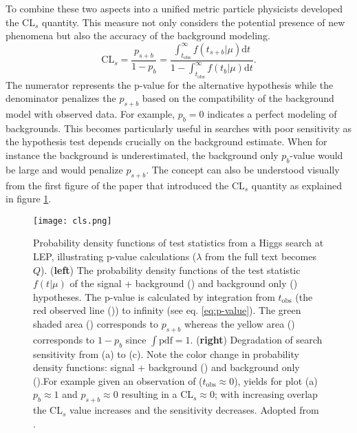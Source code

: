 To combine these two aspects into a unified metric particle physicists developed the CL$_s$ quantity. This measure not only considers the potential presence of new phenomena but also the accuracy of the background modeling.
\begin{equation}
    \mathrm{CL}_s=\frac{p_{s+b}}{1-p_{b}}=
    \frac
    {\int_{t_\text{obs}}^{\infty}
        f(t_{s+b} | \mu) \mathrm{d}t}
    {1-\int_{t_\text{obs}}^{\infty}
        f(t_{b} | \mu) \mathrm{d}t}.
\end{equation}
The numerator represents the p-value for the alternative hypothesis while the denominator penalizes the $p_{s+b}$ based on the compatibility of the background model with observed data. For example, $p_{b} = 0$ indicates a perfect modeling of backgrounds. This becomes particularly useful in searches with poor sensitivity as the hypothesis test depends crucially on the background estimate. When for instance the background is underestimated, the background only $p_b$-value would be large and would penalize $p_{s+b}$. The concept can also be understood visually from the first figure of the paper that introduced the CL$_s$ quantity \citep{read2002presentation} as explained
in figure \ref{fig:cls}.
\begin{figure}
    \centering
    \texttt{[image: cls.png]}
    \caption[]{Probability density functions of test statistics from a Higgs search at LEP, illustrating p-value calculations ($\lambda$ from the full text becomes $Q$). (\textbf{left}) The probability density functions of the test statistic $f(t | \mu)$ of the signal + background ({\color[HTML]{804000}{$\bm{\diagup}$}}) and background only ({\color[HTML]{2100FF}{$\bm{\diagup}$}}) hypotheses. The p-value is calculated by integration from $t_\text{obs}$ (the red observed line ({\color[HTML]{FF0000}{$\bm{\diagup}$}})) to infinity (see eq. \ref{eq:p-value}). The green shaded area () corresponds to $p_{s+b}$ whereas the yellow area () corresponds to $1-p_b$ since $\int \mathrm{pdf}=1$. (\textbf{right}) Degradation of search sensitivity from (a) to (c). Note the color change in probability density functions: signal + background () and background only ().For example given an observation of ($t_\text{obs}\approx0$), yields for plot (a) $p_{b}\approx 1$ and $p_{s+b}\approx 0$ resulting in a CL$_s\approx 0$; with increasing overlap the CL$_s$ value increases and the sensitivity decreases. Adopted from \citep{read2002presentation}.}
    \label{fig:cls}
\end{figure}


